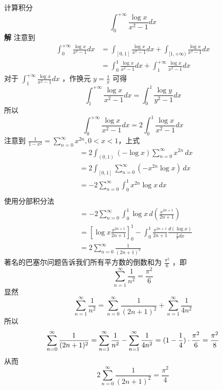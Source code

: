 \documentclass{ctexbook}
\newcommand{\no}{\noindent}
\newcommand{\EXP}{\no {\bf 例}\quad}
\begin{document}
\EXP 计算积分
\[
	\int_0^{+\infty} \frac{\log x}{x^2 - 1} dx
\]
{\bf 解} 注意到
\[
\begin{aligned}
	\int_0^{+\infty} \frac{\log x}{x^2 - 1} dx 
	&= \int_{[0,1]} \frac{\log x}{x^2 - 1} dx + \int_{[1,+\infty)} \frac{\log x}{x^2 - 1} dx\\
	&= \int_0^1 \frac{\log x}{x^2 - 1} dx + \int_1^{+\infty} \frac{\log x}{x^2 - 1} dx
\end{aligned}
\]
对于 $\int_1^{+\infty} \frac{\log x}{x^2 - 1} dx$ ，作换元 $y = \frac1x$ 可得
\[
	\int_1^{+\infty} \frac{\log x}{x^2 - 1} dx = \int_0^{1} \frac{\log y}{y^2 - 1} dx
\]
所以
\[
	\int_0^{+\infty} \frac{\log x}{x^2 - 1} dx = 2 \int_0^1 \frac{\log x}{x^2 - 1} dx 
\]
注意到 $\frac{1}{1-x^2} = \sum\limits_{n=0}^\infty x^{2n}, 0<x<1$，上式
\[
	\begin{aligned}
		&=2\int_{(0,1)} (-\log x) \sum_{n=0}^\infty x^{2n}\, dx\\
		&= 2\int_{[0,1]} \sum_{n=0}^{\infty} (- x^{2n} \log x)\, dx\\
		&= -2 \sum_{n=0}^{\infty} \int_0^1 x^{2n} \log x\, dx\\
	\end{aligned}
\]
使用分部积分法
\[
	\begin{aligned}
		&= -2 \sum_{n=0}^{\infty} \int_0^1  \log x\, d\left(\frac{x^{2n+1}}{2n+1} \right)\\
		&= \left[\log x \frac{x^{2n+1}}{2n+1}\right]_0^1 - \int_0^1 \frac{x^{2n+1}}{2n+1} \frac{d(\log x)}{\frac1x dx}\\
		&= 2\sum_{n=0}^\infty \frac{1}{(2n+1)^2}
	\end{aligned}
\]
著名的巴塞尔问题告诉我们所有平方数的倒数和为 $\frac{\pi^2}{6}$ ，即
\[
	\sum _{n=1}^{\infty }\frac{1}{n^{2}} = \frac{\pi^2}{6}
\]
显然	
\[
	\sum _{n=1}^{\infty }\frac{1}{n^{2}} = \sum_{n=0}^\infty \frac{1}{(2n+1)^2} + \sum_{n=1}^\infty \frac{1}{4n^2}
\]
所以
  $$\sum_{n=0}^\infty \frac{1}{(2n+1)^2}=\sum_{n=1}^\infty\limits\frac{1}{n^2}-\sum_{n=1}^\infty\limits\frac{1}{4n^2} = (1-\frac{1}{4})\cdot \frac{\pi^2}{6}=\frac{\pi^2}{8}$$
从而
\[
	2\sum_{n=0}^\infty \frac{1}{(2n+1)^2} = \frac{\pi^2}{4}
\]
\end{document}
